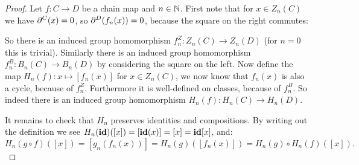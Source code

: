 \begin{proof}
	Let $f: C \to D$ be a chain map and $n \in \mathbb{N}$. First note that for $x \in Z_n(C)$ we have $\partial^C(x) = 0$, so $\partial^D(f_n(x)) = 0$, because the square on the right commutes:

	{\centering
	\par}

	So there is an induced group homomorphism $f^Z_n : Z_n(C) \to Z_n(D)$ (for $n=0$ this is trivial). Similarly there is an induced group homomorphism $f^B_n : B_n(C) \to B_n(D)$ by considering the square on the left. Now define the map $H_n(f) : x \mapsto [f_n(x)]$ for $x \in Z_n(C)$, we now know that $f_n(x)$ is also a cycle, because of $f^Z_n$. Furthermore it is well-defined on classes, because of $f^B_n$. So indeed there is an induced group homomorphism $H_n(f) : H_n(C) \to H_n(D)$.

	It remains to check that $H_n$ preserves identities and compositions. By writing out the definition we see $H_n(\mathbf{id})([x]) = [\mathbf{id}(x)] = [x] = \mathbf{id}[x]$, and:
	$$ H_n(g \circ f)([x]) = [g_n(f_n(x))] = H_n(g)([f_n(x)]) = H_n(g) \circ H_n(f) ([x]). $$
\end{proof}

